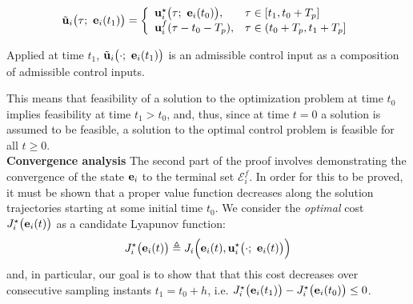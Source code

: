 \begin{equation}
  \tilde{\bm{\mathbf{u}}}_i\big(\tau;\ \bm{\mathbf{e}}_i(t_1)\big) = \left\{ \\
      \begin{array}{ll}
        \bm{\mathbf{u}}_i^{\star}\big(\tau;\ \bm{\mathbf{e}}_i(t_0)\big), & \tau \in [t_1, t_0 + T_p] \\
        \bm{\mathbf{u}}_i^f(\tau - t_0 - T_p), & \tau \in (t_0 + T_p, t_1 + T_p]
      \end{array}
      \right.
\label{eq:optimal_input_t_plus_one}
\end{equation}

Applied at time $t_1$, $\tilde{\bm{\mathbf{u}}}_i\big(\cdot;\ \bm{\mathbf{e}}_i(t_1)\big)$
is an admissible control input as a composition of admissible control inputs.

This means that feasibility of a solution to the optimization problem at time
$t_0$ implies feasibility at time $t_1 > t_0$, and, thus, since at time $t=0$
a solution is assumed to be feasible, a solution to the optimal control problem
is feasible for all $t \geq 0$.\\

\textbf{Convergence analysis}
The second part of the proof involves demonstrating the convergence of the
state $\bm{\mathbf{e}}_i$ to the terminal set $\mathcal{E}_i^f$. In order for this
to be proved, it must be shown that a proper value function decreases along
the solution trajectories starting at some initial time $t_0$. We consider the
\textit{optimal} cost $J_i^{\star}\big(\bm{\mathbf{e}}_i(t)\big)$ as a candidate
Lyapunov function:
$$J_i^{\star}\big(\bm{\mathbf{e}}_i(t)\big) \triangleq J_i \Big(\bm{\mathbf{e}}_i(t), \bm{\mathbf{u}}_i^{\star}\big(\cdot;\ \bm{\mathbf{e}}_i(t)\big)\Big)$$
and, in particular, our goal is to show that that this cost decreases over
consecutive sampling instants $t_1 = t_0 + h$, i.e.
$J_i^{\star}\big(\bm{\mathbf{e}}_i(t_1)\big) - J_i^{\star}\big(\bm{\mathbf{e}}_i(t_0)\big) \leq 0$.\\

